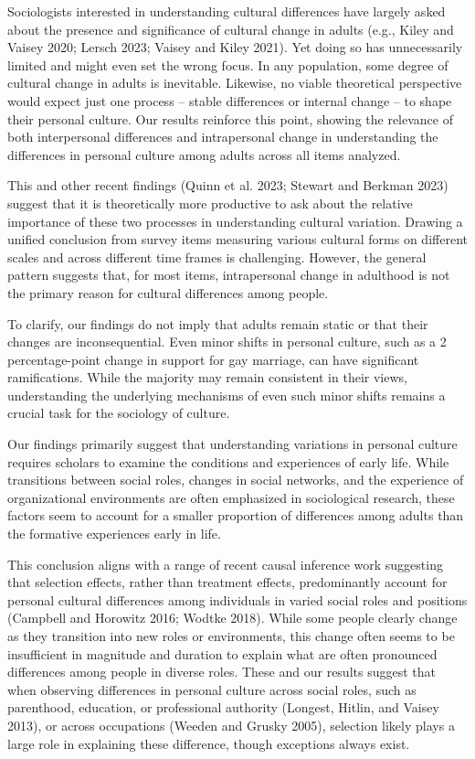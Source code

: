 \documentclass[
  12pt,
]{article}
\begin{document}
Sociologists interested in understanding cultural differences have
largely asked about the presence and significance of cultural change in
adults (e.g., Kiley and Vaisey 2020; Lersch 2023; Vaisey and Kiley
2021). Yet doing so has unnecessarily limited and might even set the
wrong focus. In any population, some degree of cultural change in adults
is inevitable. Likewise, no viable theoretical perspective would expect
just one process -- stable differences or internal change -- to shape
their personal culture. Our results reinforce this point, showing the
relevance of both interpersonal differences and intrapersonal change in
understanding the differences in personal culture among adults across
all items analyzed.

This and other recent findings (Quinn et al. 2023; Stewart and Berkman
2023) suggest that it is theoretically more productive to ask about the
relative importance of these two processes in understanding cultural
variation. Drawing a unified conclusion from survey items measuring
various cultural forms on different scales and across different time
frames is challenging. However, the general pattern suggests that, for
most items, intrapersonal change in adulthood is not the primary reason
for cultural differences among people.

To clarify, our findings do not imply that adults remain static or that
their changes are inconsequential. Even minor shifts in personal
culture, such as a 2 percentage-point change in support for gay
marriage, can have significant ramifications. While the majority may
remain consistent in their views, understanding the underlying
mechanisms of even such minor shifts remains a crucial task for the
sociology of culture.

Our findings primarily suggest that understanding variations in personal
culture requires scholars to examine the conditions and experiences of
early life. While transitions between social roles, changes in social
networks, and the experience of organizational environments are often
emphasized in sociological research, these factors seem to account for a
smaller proportion of differences among adults than the formative
experiences early in life.

This conclusion aligns with a range of recent causal inference work
suggesting that selection effects, rather than treatment effects,
predominantly account for personal cultural differences among
individuals in varied social roles and positions (Campbell and Horowitz
2016; Wodtke 2018). While some people clearly change as they transition
into new roles or environments, this change often seems to be
insufficient in magnitude and duration to explain what are often
pronounced differences among people in diverse roles. These and our
results suggest that when observing differences in personal culture
across social roles, such as parenthood, education, or professional
authority (Longest, Hitlin, and Vaisey 2013), or across occupations
(Weeden and Grusky 2005), selection likely plays a large role in
explaining these difference, though exceptions always exist.
\end{document}
